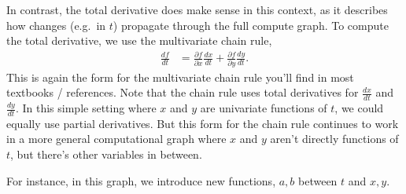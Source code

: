 \documentclass{article}
\newcommand{\dd}[2][]{\frac{\partial #1}{\partial #2}}
\newcommand{\dt}[2][]{\frac{d #1}{d #2}}
\begin{document}
In contrast, the total derivative does make sense in this context, as it describes how changes (e.g.\ in $t$) propagate through the full compute graph.
To compute the total derivative, we use the multivariate chain rule,
\begin{align}
  \label{eq:chain_example}
  \dt[f]{t} &= \dd[f]{x} \dt[x]{t} + \dd[f]{y} \dt[y]{t}.
\end{align}
This is again the form for the multivariate chain rule you'll find in most textbooks / references.
Note that the chain rule uses total derivatives for $\dt[x]{t}$ and $\dt[y]{t}$.
In this simple setting where $x$ and $y$ are univariate functions of $t$, we could equally use partial derivatives.
But this form for the chain rule continues to work in a more general computational graph where $x$ and $y$ aren't directly functions of $t$, but there's other variables in between.
\begin{center}
\end{center}
For instance, in this graph, we introduce new functions, $a, b$ between $t$ and $x, y$.
\end{document}
